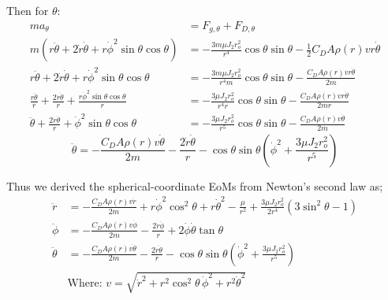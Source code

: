\documentclass[titlepage]{article}
\begin{document}
Then for $\theta$:
\begin{equation}
	\begin{split}
		ma_\theta&=F_{g,\theta}+F_{D,\theta} \\
		m\left(r\ddot{\theta}+2\dot{r}\dot{\theta}+r\dot{\phi}^2\sin\theta\cos\theta\right)&=-\frac{3m\mu J_2r_o^2}{r^4}\cos\theta\sin\theta-\frac{1}{2}C_DA\rho(r)vr\dot{\theta} \\
		r\ddot{\theta}+2\dot{r}\dot{\theta}+r\dot{\phi}^2\sin\theta\cos\theta&=-\frac{3m\mu J_2r_o^2}{r^4m}\cos\theta\sin\theta-\frac{C_DA\rho(r)vr\dot{\theta}}{2m} \\
		\frac{r\ddot{\theta}}{r}+\frac{2\dot{r}\dot{\theta}}{r}+\frac{r\dot{\phi}^2\sin\theta\cos\theta}{r}&=-\frac{3\mu J_2r_o^2}{r^4r}\cos\theta\sin\theta-\frac{C_DA\rho(r)vr\dot{\theta}}{2mr} \\
		\ddot{\theta}+\frac{2\dot{r}\dot{\theta}}{r}+\dot{\phi}^2\sin\theta\cos\theta&=-\frac{3\mu J_2r_o^2}{r^5}\cos\theta\sin\theta-\frac{C_DA\rho(r)v\dot{\theta}}{2m}
	\end{split}
\end{equation}
\begin{equation}
	\ddot{\theta}=-\frac{C_DA\rho(r)v\dot{\theta}}{2m}-\frac{2\dot{r}\dot{\theta}}{r}-\cos\theta\sin\theta\left(\dot{\phi}^2+\frac{3\mu J_2r_o^2}{r^5}\right)
\end{equation}

\begin{mdframed}[linewidth=1pt, innertopmargin=10pt, innerbottommargin=10pt]
	Thus we derived the spherical-coordinate EoMs from Newton's second law as;
	\begin{equation}
		\begin{split}
			\ddot{r}&=-\frac{C_DA\rho(r)v\dot{r}}{2m}+r\dot{\phi}^2\cos^2\theta+r\dot{\theta}^2-\frac{\mu}{r^2}+\frac{3\mu J_2r_o^2}{2r^4}\left(3\sin^2\theta-1\right) \\
			\ddot{\phi}&=-\frac{C_DA\rho(r)v\dot{\phi}}{2m}-\frac{2\dot{r}\dot{\phi}}{r}+2\dot{\phi}\dot{\theta}\tan\theta \\
			\ddot{\theta}&=-\frac{C_DA\rho(r)v\dot{\theta}}{2m}-\frac{2\dot{r}\dot{\theta}}{r}-\cos\theta\sin\theta\left(\dot{\phi}^2+\frac{3\mu J_2r_o^2}{r^5}\right) \\
			&\text{Where:  }v=\sqrt{\dot{r}^2+r^2\cos^2\theta\,\dot{\phi}^2+r^2\dot{\theta}^2}
		\end{split}
		\label{eq:eom2}
	\end{equation}
\end{mdframed}
\end{document}
